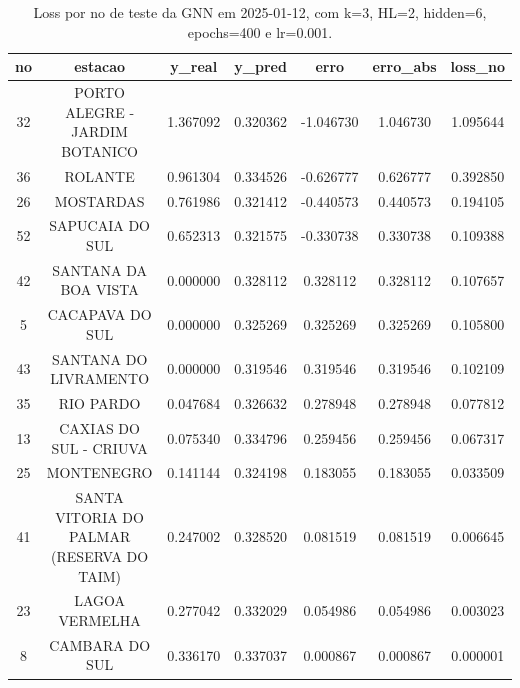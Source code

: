 \begin{table}[h]
\centering
\caption{Loss por no de teste da GNN em 2025-01-12, com k=3, HL=2, hidden=6, epochs=400 e lr=0.001.}
\label{tab:gnn_loss_k3_hl2_h6_e400_d20250112}
\begin{tabular}{ccccccc}
\toprule
no & estacao & y\_real & y\_pred & erro & erro\_abs & loss\_no \\
\midrule
32 & PORTO ALEGRE - JARDIM BOTANICO & 1.367092 & 0.320362 & -1.046730 & 1.046730 & 1.095644 \\
36 & ROLANTE & 0.961304 & 0.334526 & -0.626777 & 0.626777 & 0.392850 \\
26 & MOSTARDAS & 0.761986 & 0.321412 & -0.440573 & 0.440573 & 0.194105 \\
52 & SAPUCAIA DO SUL & 0.652313 & 0.321575 & -0.330738 & 0.330738 & 0.109388 \\
42 & SANTANA DA BOA VISTA & 0.000000 & 0.328112 & 0.328112 & 0.328112 & 0.107657 \\
5 & CACAPAVA DO SUL & 0.000000 & 0.325269 & 0.325269 & 0.325269 & 0.105800 \\
43 & SANTANA DO LIVRAMENTO & 0.000000 & 0.319546 & 0.319546 & 0.319546 & 0.102109 \\
35 & RIO PARDO & 0.047684 & 0.326632 & 0.278948 & 0.278948 & 0.077812 \\
13 & CAXIAS DO SUL - CRIUVA & 0.075340 & 0.334796 & 0.259456 & 0.259456 & 0.067317 \\
25 & MONTENEGRO & 0.141144 & 0.324198 & 0.183055 & 0.183055 & 0.033509 \\
41 & SANTA VITORIA DO PALMAR (RESERVA DO TAIM) & 0.247002 & 0.328520 & 0.081519 & 0.081519 & 0.006645 \\
23 & LAGOA VERMELHA & 0.277042 & 0.332029 & 0.054986 & 0.054986 & 0.003023 \\
8 & CAMBARA DO SUL & 0.336170 & 0.337037 & 0.000867 & 0.000867 & 0.000001 \\
\bottomrule
\end{tabular}
\end{table}
